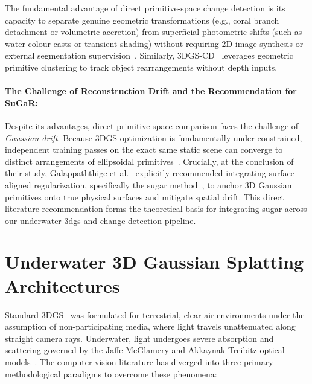 The fundamental advantage of direct primitive-space change detection is its capacity to separate genuine geometric transformations (e.g., coral branch detachment or volumetric accretion) from superficial photometric shifts (such as water colour casts or transient shading) without requiring 2D image synthesis or external segmentation supervision~\cite{galappaththige2026pixelsprimitivesscenechange}. Similarly, 3DGS-CD~\cite{10852207} leverages geometric primitive clustering to track object rearrangements without depth inputs.

\paragraph{The Challenge of Reconstruction Drift and the Recommendation for SuGaR:} Despite its advantages, direct primitive-space comparison faces the challenge of \textit{Gaussian drift}. Because 3DGS optimization is fundamentally under-constrained, independent training passes on the exact same static scene can converge to distinct arrangements of ellipsoidal primitives~\cite{galappaththige2026pixelsprimitivesscenechange}. Crucially, at the conclusion of their study, Galappaththige et al.~\cite{galappaththige2026pixelsprimitivesscenechange} explicitly recommended integrating surface-aligned regularization, specifically the \gls{sugar} method~\cite{guedon2024sugar}, to anchor 3D Gaussian primitives onto true physical surfaces and mitigate spatial drift. This direct literature recommendation forms the theoretical basis for integrating \gls{sugar} across our underwater \gls{3dgs} and change detection pipeline.

\section{Underwater 3D Gaussian Splatting Architectures}
\label{sec:lit_underwater_3dgs}
Standard 3DGS~\cite{10897713} was formulated for terrestrial, clear-air environments under the assumption of non-participating media, where light travels unattenuated along straight camera rays. Underwater, light undergoes severe absorption and scattering governed by the Jaffe-McGlamery and Akkaynak-Treibitz optical models~\cite{10203316, 11128502}. The computer vision literature has diverged into three primary methodological paradigms to overcome these phenomena:

